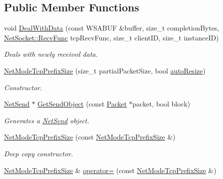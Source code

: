 \subsection*{Public Member Functions}
\begin{DoxyCompactItemize}
\item 
void \hyperlink{class_net_mode_tcp_prefix_size_ae3b7be4877c44df177bc771ea5cae4df}{DealWithData} (const WSABUF \&buffer, size\_\-t completionBytes, \hyperlink{class_net_socket_a52b5f4de8d0a47fd8620f542b21c076c}{NetSocket::RecvFunc} tcpRecvFunc, size\_\-t clientID, size\_\-t instanceID)
\begin{DoxyCompactList}\small\item\em Deals with newly received data. \item\end{DoxyCompactList}\item 
\hyperlink{class_net_mode_tcp_prefix_size_a110d235c719f95b3549b80ee4b91999a}{NetModeTcpPrefixSize} (size\_\-t partialPacketSize, bool \hyperlink{class_net_mode_tcp_ae1bb51196acb2d71e38ce60b0860a1fc}{autoResize})
\begin{DoxyCompactList}\small\item\em Constructor. \item\end{DoxyCompactList}\item 
\hyperlink{class_net_send}{NetSend} $\ast$ \hyperlink{class_net_mode_tcp_prefix_size_ab1c734f295e365dce076f68a162d169a}{GetSendObject} (const \hyperlink{class_packet}{Packet} $\ast$packet, bool block)
\begin{DoxyCompactList}\small\item\em Generates a \hyperlink{class_net_send}{NetSend} object. \item\end{DoxyCompactList}\item 
\hyperlink{class_net_mode_tcp_prefix_size_ad1699c4b162ac5e0830d21a6182cf348}{NetModeTcpPrefixSize} (const \hyperlink{class_net_mode_tcp_prefix_size}{NetModeTcpPrefixSize} \&)
\begin{DoxyCompactList}\small\item\em Deep copy constructor. \item\end{DoxyCompactList}\item 
\hyperlink{class_net_mode_tcp_prefix_size}{NetModeTcpPrefixSize} \& \hyperlink{class_net_mode_tcp_prefix_size_a7b77632e19baac0b859d17d67c16abf1}{operator=} (const \hyperlink{class_net_mode_tcp_prefix_size}{NetModeTcpPrefixSize} \&)

\end{DoxyCompactItemize}
